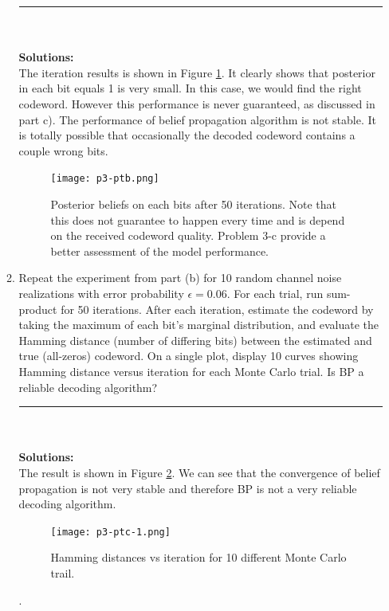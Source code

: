 \documentclass{article}
\begin{document}
\begin{enumerate}
\begin{enumerate}
\noindent\rule{14cm}{2pt}
\\
\\
\textbf{Solutions:}
\\
The iteration results is shown in Figure \ref{fig:p3-ptb}. It clearly shows that posterior in each bit equals 1 is very small. In this case, we would find the right codeword. However this performance is never guaranteed, as discussed in part c). The performance of belief propagation algorithm is not stable. It is totally possible that occasionally the decoded codeword contains a couple wrong bits.
\begin{figure}
\texttt{[image: p3-ptb.png]}
\centering
\caption{Posterior beliefs on each bits after 50 iterations. Note that this does not guarantee to happen every time and is depend on the received codeword quality. Problem 3-c provide a better assessment of the model performance.}
\label{fig:p3-ptb}
\end{figure}


\pagebreak
\item Repeat the experiment from part (b) for 10 random channel noise realizations with error probability $\epsilon= 0.06$. For each trial, run sum-product for 50 iterations. After each iteration, estimate the codeword by taking the maximum of each bit's marginal distribution, and evaluate the Hamming distance (number of differing bits) between the estimated and true (all-zeros) codeword. On a single plot, display 10 curves showing Hamming distance versus iteration for each Monte Carlo trial. Is BP a reliable decoding algorithm?
\\
\noindent\rule{14cm}{2pt}
\\
\\
\textbf{Solutions:}
\\
The result is shown in Figure \ref{fig:p3-ptc-1}. We can see that the convergence of belief propagation is not very stable and therefore BP is not a very reliable decoding algorithm.
\begin{figure}
\texttt{[image: p3-ptc-1.png]}
\centering
\caption{Hamming distances vs iteration for 10 different Monte Carlo trail.}
\label{fig:p3-ptc-1}
\end{figure}.


\end{enumerate}
\end{enumerate}
\end{document}
